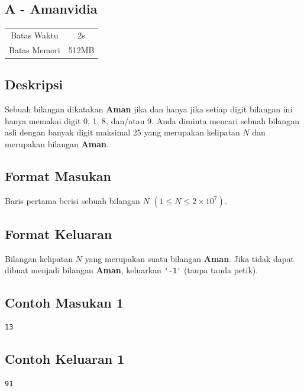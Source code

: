 \documentclass{article}
\begin{document}
\begin{center}
    \section*{A - Amanvidia} %

    \begin{tabular}{ | c c | }
        \hline
        Batas Waktu  & 2s \\    %
        Batas Memori & 512MB \\  %
        \hline
    \end{tabular}
\end{center}

\subsection*{Deskripsi}
Sebuah bilangan dikatakan \textbf{Aman} jika dan hanya jika setiap digit bilangan ini hanya memakai digit 0, 1, 8, dan/atau 9.  Anda diminta mencari sebuah bilangan asli dengan banyak digit maksimal 25 yang merupakan kelipatan $N$ dan merupakan bilangan \textbf{Aman}.

\subsection*{Format Masukan}

Baris pertama berisi sebuah bilangan $N$ $(1 \leq N \leq 2 \times 10^7)$.


\subsection*{Format Keluaran}
Bilangan kelipatan $N$ yang merupakan suatu bilangan \textbf{Aman}. Jika tidak dapat dibuat menjadi bilangan \textbf{Aman}, keluarkan \lstinline|'-1'| (tanpa tanda petik).

\begin{multicols}{2}
\subsection*{Contoh Masukan 1}
\begin{lstlisting}
13
\end{lstlisting}
\columnbreak
\subsection*{Contoh Keluaran 1}
\begin{lstlisting}
91
\end{lstlisting}
\vfill
\null
\end{multicols}
\end{document}
